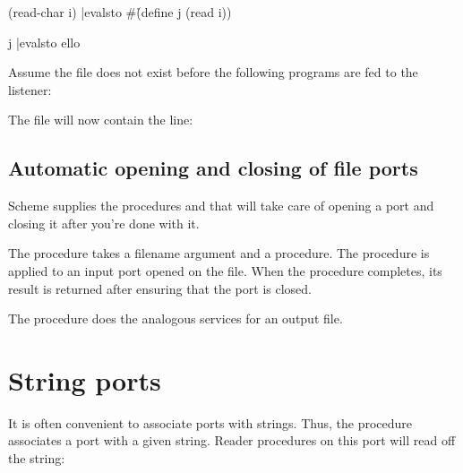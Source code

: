 {{{(read-char i)
|evalsto #\h

(define j (read i))

j
|evalsto ello
}

Assume the file  does not exist before the
following programs are fed to the listener:


\n The file  will now contain the
line:


\subsection{Automatic opening and closing of file ports}

Scheme supplies the procedures  and
 that will take care of opening a
port and closing it after you're done with it.

The procedure  takes a filename
argument and a procedure.  The procedure is applied to an
input port opened on the file.  When the procedure
completes, its result is returned after ensuring that the
port is closed.


The procedure  does the analogous
services for an output file.



\section{String ports}

It is often convenient to associate ports with strings.
Thus, the procedure  associates a port
with a given string.  Reader procedures on this port will
read off the string:

}}
